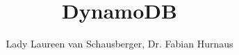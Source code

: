 \documentclass[bachelor,english]{hgbthesis}
\title{DynamoDB}
\author{Lady Laureen van Schausberger, Dr. Fabian Hurnaus}
\begin{document}

\frontmatter							%

\maketitle
\tableofcontents

%
%

\mainmatter          			%










\appendix                                         %


\MakeBibliography                        				%

%

\end{document}
